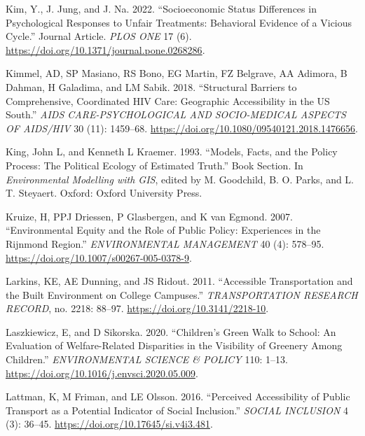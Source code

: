 \documentclass[12pt, oneside]{report}
\newlength{\cslhangindent}
\newlength{\cslentryspacingunit} %
\newenvironment{CSLReferences}[2] %
 {%
  \setlength{\parindent}{0pt}
  \ifodd #1
  \let\oldpar\par
  \def\par{\hangindent=\cslhangindent\oldpar}
  \fi
  \setlength{\parskip}{#2\cslentryspacingunit}
 }%
 {}
\begin{document}
\begin{CSLReferences}{1}{0}
\leavevmode{}%
Kim, Y., J. Jung, and J. Na. 2022. {``Socioeconomic Status Differences
in Psychological Responses to Unfair Treatments: Behavioral Evidence of
a Vicious Cycle.''} Journal Article. \emph{PLOS ONE} 17 (6).
\url{https://doi.org/10.1371/journal.pone.0268286}.

\leavevmode{}%
Kimmel, AD, SP Masiano, RS Bono, EG Martin, FZ Belgrave, AA Adimora, B
Dahman, H Galadima, and LM Sabik. 2018. {``Structural Barriers to
Comprehensive, Coordinated {HIV} Care: Geographic Accessibility in the
{US South}.''} \emph{AIDS CARE-PSYCHOLOGICAL AND SOCIO-MEDICAL ASPECTS
OF AIDS/HIV} 30 (11): 1459--68.
\url{https://doi.org/10.1080/09540121.2018.1476656}.

\leavevmode{}%
King, John L, and Kenneth L Kraemer. 1993. {``Models, Facts, and the
Policy Process: The Political Ecology of Estimated Truth.''} Book
Section. In \emph{Environmental Modelling with GIS}, edited by M.
Goodchild, B. O. Parks, and L. T. Steyaert. Oxford: Oxford University
Press.

\leavevmode{}%
Kruize, H, PPJ Driessen, P Glasbergen, and K van Egmond. 2007.
{``Environmental Equity and the Role of Public Policy: {Experiences} in
the Rijnmond Region.''} \emph{ENVIRONMENTAL MANAGEMENT} 40 (4): 578--95.
\url{https://doi.org/10.1007/s00267-005-0378-9}.

\leavevmode{}%
Larkins, KE, AE Dunning, and JS Ridout. 2011. {``Accessible
{Transportation} and the {Built Environment} on {College Campuses}.''}
\emph{TRANSPORTATION RESEARCH RECORD}, no. 2218: 88--97.
\url{https://doi.org/10.3141/2218-10}.

\leavevmode{}%
Laszkiewicz, E, and D Sikorska. 2020. {``Children's Green Walk to
School: {An} Evaluation of Welfare-Related Disparities in the Visibility
of Greenery Among Children.''} \emph{ENVIRONMENTAL SCIENCE \& POLICY}
110: 1--13. \url{https://doi.org/10.1016/j.envsci.2020.05.009}.

\leavevmode{}%
Lattman, K, M Friman, and LE Olsson. 2016. {``Perceived {Accessibility}
of {Public Transport} as a {Potential Indicator} of {Social
Inclusion}.''} \emph{SOCIAL INCLUSION} 4 (3): 36--45.
\url{https://doi.org/10.17645/si.v4i3.481}.


\end{CSLReferences}
\end{document}
